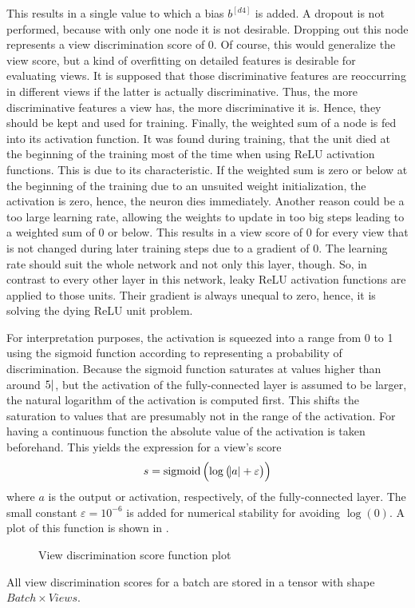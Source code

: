 This results in a single value to which a bias $b^{[d4]}$ is added.
A dropout is not performed, because with only one node it is not desirable.
Dropping out this node represents a view discrimination score of 0.
Of course, this would generalize the view score, but a kind of overfitting on detailed features is desirable for evaluating views.
It is supposed that those discriminative features are reoccurring in different views if the latter is actually discriminative.
Thus, the more discriminative features a view has, the more discriminative it is.
Hence, they should be kept and used for training.
Finally, the weighted sum of a node is fed into its activation function.
It was found during training, that the unit died at the beginning of the training most of the time when using ReLU activation functions.
This is due to its characteristic.
If the weighted sum is zero or below at the beginning of the training due to an unsuited weight initialization, the activation is zero, hence, the neuron dies immediately.
Another reason could be a too large learning rate, allowing the weights to update in too big steps leading to a weighted sum of 0 or below.
This results in a view score of $0$ for every view that is not changed during later training steps due to a gradient of 0.
The learning rate should suit the whole network and not only this layer, though.
So, in contrast to every other layer in this network, leaky ReLU activation functions are applied to those units.
Their gradient is always unequal to zero, hence, it is solving the dying ReLU unit problem.

For interpretation purposes, the activation is squeezed into a range from 0 to 1 using the sigmoid function according to \cite{Feng2018} representing a probability of discrimination.
Because the sigmoid function saturates at values higher than around $\abs{5}$, but the activation of the fully-connected layer is assumed to be larger, the natural logarithm of the activation is computed first.
This shifts the saturation to values that are presumably not in the range of the activation.
For having a continuous function the absolute value of the activation is taken beforehand.
This yields the expression for a view's score
\begin{equation}
	\label{eq:view-discrimination-score}
	s = \operatorname{sigmoid}\left( \log \left( \abs{a} + \varepsilon \right) \right)
\end{equation}
where $a$ is the output or activation, respectively, of the fully-connected layer.
The small constant $\varepsilon=10^{-6}$ is added for numerical stability for avoiding $\log(0)$.
A plot of this function is shown in .
\begin{figure}
	\setlength{}
	\setlength{}
	\centering
	
	\caption{View discrimination score function plot}
	\label{fig:view-discrimination-score}
\end{figure}
All view discrimination scores for a batch are stored in a tensor with shape $Batch \times Views$.

